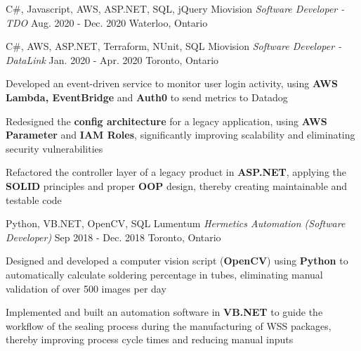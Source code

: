 \begin{siderules}
  \begin{cventries}
    \cventry
    {C\#, Javascript, AWS, ASP.NET, SQL, jQuery}
    {Miovision \hspace{0.15em} \bodyfontlight\itshape{Software Developer - TDO}}
    {Aug. 2020 - Dec. 2020}
    {Waterloo, Ontario}
    {
      \begin{cvitems}
        \item {}
        \item {}
        \item {}
      \end{cvitems}
    }
    \cventry
    {C\#, AWS, ASP.NET, Terraform, NUnit, SQL}
    {Miovision \hspace{0.15em} \bodyfontlight\itshape{Software Developer - DataLink}}
    {Jan. 2020 - Apr. 2020}
    {Toronto, Ontario}
    {
      \begin{cvitems}
        \item {Developed an event-driven service to monitor user login activity, using \textbf{AWS Lambda, EventBridge} and \textbf{Auth0} to send metrics to Datadog}
        \item {Redesigned the \textbf{config architecture} for a legacy application, using \textbf{AWS Parameter} and \textbf{IAM Roles}, significantly improving scalability and eliminating security vulnerabilities}
        \item {Refactored the controller layer of a legacy product in \textbf{ASP.NET}, applying the \textbf{SOLID} principles and proper \textbf{OOP} design, thereby creating maintainable and testable code}
      \end{cvitems}
    }
    \cventry
      {Python, VB.NET, OpenCV, SQL}
      {Lumentum \hspace{0.15em} \bodyfontlight\itshape{Hermetics Automation (Software Developer)}}
      {Sep 2018 - Dec. 2018}
      {Toronto, Ontario}
      {
        \begin{cvitems}
          \item {Designed and developed a computer vision script (\textbf{OpenCV}) using \textbf{Python} to automatically calculate soldering percentage in tubes, eliminating manual validation of over 500 images per day}
          \item {Implemented and built an automation software in \textbf{VB.NET} to guide the workflow of the sealing process during the manufacturing of WSS packages, thereby improving process cycle times and reducing manual inputs}

\end{cvitems}}
\end{cventries}
\end{siderules}
